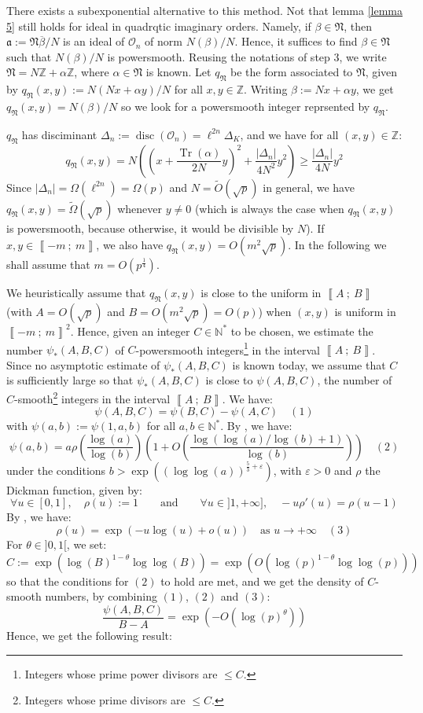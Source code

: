 \documentclass[a4paper,10pt]{report}
\theoremstyle{definition}
\theoremstyle{plain}
\theoremstyle{definition}
\newcommand{\N}{\mathbb{N}}
\newcommand{\Z}{\mathbb{Z}}
\newcommand{\mO}{\mathcal{O}}
\renewcommand{\i}[2]{\left\llbracket #1~;~#2\right\rrbracket}
\renewcommand{\(}{\left(}
\renewcommand{\)}{\right)}
\newcommand{\mf}[1]{\mathfrak{#1}}
\DeclareMathOperator{\Tr}{Tr}
\DeclareMathOperator{\disc}{disc}
\begin{document}
There exists a subexponential alternative to this method. Not that lemma \ref{lemma 5} still holds for ideal in quadrqtic imaginary orders. Namely, if $\beta\in\mf{N}$, then $\mf{a}:=\mf{N}\overline{\beta}/N$ is an ideal of $\mO_n$ of norm $N(\beta)/N$. Hence, it suffices to find $\beta\in \mf{N}$ such that $N(\beta)/N$ is powersmooth. Reusing the notations of step 3, we write $\mf{N}=N\Z+\alpha\Z$, where $\alpha\in\mf{N}$ is known. Let $q_{\mf{N}}$ be the form associated to $\mf{N}$, given by $q_{\mf{N}}(x,y):=N(Nx+\alpha y)/N$ for all $x, y\in\Z$. Writing $\beta:=Nx+\alpha y$, we get $q_{\mf{N}}(x,y)=N(\beta)/N$ so we look for a powersmooth integer reprsented by $q_{\mf{N}}$.

$q_{\mf{N}}$ has disciminant $\Delta_n:=\disc(\mO_n)=\ell^{2n}\Delta_K$, and we have for all $(x,y)\in\Z$:
\[q_{\mf{N}}(x,y)=N\(\(x+\frac{\Tr(\alpha)}{2N}y\)^2+\frac{|\Delta_n|}{4N^2}y^2\)\geq \frac{|\Delta_n|}{4N}y^2\]
Since $|\Delta_n|=\Omega(\ell^{2n})=\Omega(p)$ and $N=\tilde{O}(\sqrt{p})$ in general, we have $q_{\mf{N}}(x,y)=\tilde{\Omega}(\sqrt{p})$ whenever $y\neq 0$ (which is always the case when $q_{\mf{N}}(x,y)$ is powersmooth, because otherwise, it would be divisible by $N$).  If $x,y\in\i{-m}{m}$, we also have $q_{\mf{N}}(x,y)=O(m^2\sqrt{p})$.  In the following we shall assume that $m=O(p^{\frac{1}{4}})$.

We heuristically assume that $q_{\mf{N}}(x,y)$ is close to the uniform in $\i{A}{B}$ (with $A=O(\sqrt{p})$ and $B=O(m^2\sqrt{p})=O(p)$) when $(x,y)$ is uniform in $\i{-m}{m}^2$. Hence, given an integer $C\in\N^*$ to be chosen,  we estimate the number $\psi_*(A,B,C)$ of $C$-powersmooth integers\footnote{Integers whose prime power divisors are $\leq C$.} in the interval $\i{A}{B}$.  Since no asymptotic estimate of $\psi_*(A,B,C)$ is known today,  we assume that $C$ is sufficiently large so that $\psi_*(A,B,C)$ is close to $\psi(A,B,C)$, the number of $C$-smooth\footnote{Integers whose prime divisors are $\leq C$.} integers in the interval $\i{A}{B}$.  We have:
\[\psi(A,B,C)=\psi(B,C)-\psi(A,C)\quad (1)\]
with $\psi(a,b):=\psi(1,a,b)$ for all $a, b\in\N^*$. By \cite[theorem 1]{Hildebrand}, we have:
\[\psi(a,b)=a\rho\(\frac{\log(a)}{\log(b)}\)\(1+O\(\frac{\log(\log(a)/\log(b)+1)}{\log(b)}\)\)\quad (2)\]
under the conditions $b>\exp\((\log\log(a))^{\frac{5}{3}+\varepsilon}\)$, with $\varepsilon>0$ and $\rho$ the Dickman function, given by:
\[\forall u\in [0,1], \quad \rho(u):=1 \qquad \mbox{and}\qquad \forall u\in]1,+\infty], \quad -u\rho'(u)=\rho(u-1)\]
By \cite[§ 3.9]{Granville}, we have:
\[\rho(u)=\exp(-u\log(u)+o(u)) \quad \mbox{as } u\longrightarrow +\infty\quad (3)\] 
For $\theta\in ]0,1[$,  we set: 
\[C:=\exp\(\log(B)^{1-\theta}\log\log(B)\)=\exp\(O\(\log(p)^{1-\theta}\log\log(p)\)\)\]
so that the conditions for $(2)$ to hold are met, and we get the density of $C$-smooth numbers, by combining $(1)$, $(2)$ and $(3)$:
\[\frac{\psi(A,B,C)}{B-A}=\exp(-O(\log(p)^\theta))\]
Hence, we get the following result: 
\end{document}
